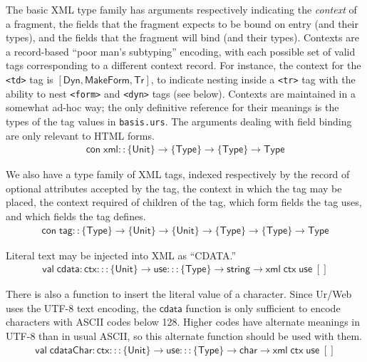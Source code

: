 \documentclass{article}
\newcommand{\mt}[1]{\mathsf{#1}}
\begin{document}
The basic XML type family has arguments respectively indicating the \emph{context} of a fragment, the fields that the fragment expects to be bound on entry (and their types), and the fields that the fragment will bind (and their types).  Contexts are a record-based ``poor man's subtyping'' encoding, with each possible set of valid tags corresponding to a different context record.  For instance, the context for the \texttt{<td>} tag is $[\mt{Dyn}, \mt{MakeForm}, \mt{Tr}]$, to indicate nesting inside a \texttt{<tr>} tag with the ability to nest \texttt{<form>} and \texttt{<dyn>} tags (see below).  Contexts are maintained in a somewhat ad-hoc way; the only definitive reference for their meanings is the types of the tag values in \texttt{basis.urs}.  The arguments dealing with field binding are only relevant to HTML forms.
$$\begin{array}{l}
  \mt{con} \; \mt{xml} :: \{\mt{Unit}\} \to \{\mt{Type}\} \to \{\mt{Type}\} \to \mt{Type}
\end{array}$$

We also have a type family of XML tags, indexed respectively by the record of optional attributes accepted by the tag, the context in which the tag may be placed, the context required of children of the tag, which form fields the tag uses, and which fields the tag defines.
$$\begin{array}{l}
  \mt{con} \; \mt{tag} :: \{\mt{Type}\} \to \{\mt{Unit}\} \to \{\mt{Unit}\} \to \{\mt{Type}\} \to \{\mt{Type}\} \to \mt{Type}
\end{array}$$

Literal text may be injected into XML as ``CDATA.''
$$\begin{array}{l}
  \mt{val} \; \mt{cdata} : \mt{ctx} ::: \{\mt{Unit}\} \to \mt{use} ::: \{\mt{Type}\} \to \mt{string} \to \mt{xml} \; \mt{ctx} \; \mt{use} \; []
\end{array}$$

There is also a function to insert the literal value of a character.  Since Ur/Web uses the UTF-8 text encoding, the $\mt{cdata}$ function is only sufficient to encode characters with ASCII codes below 128.  Higher codes have alternate meanings in UTF-8 than in usual ASCII, so this alternate function should be used with them.
$$\begin{array}{l}
  \mt{val} \; \mt{cdataChar} : \mt{ctx} ::: \{\mt{Unit}\} \to \mt{use} ::: \{\mt{Type}\} \to \mt{char} \to \mt{xml} \; \mt{ctx} \; \mt{use} \; []
\end{array}$$
\end{document}
